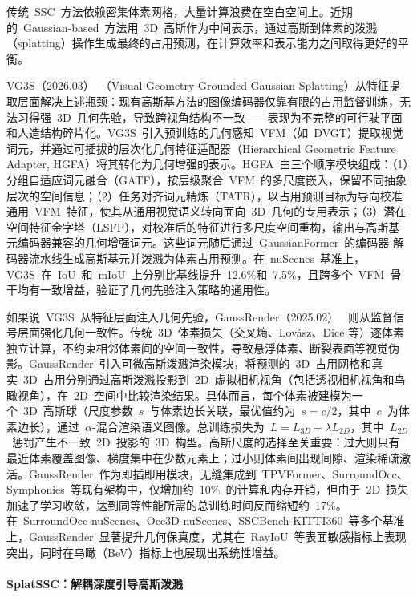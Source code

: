 传统~SSC~方法依赖密集体素网格，大量计算浪费在空白空间上。近期的~Gaussian-based~方法用~3D~高斯作为中间表示，通过高斯到体素的泼溅（splatting）操作生成最终的占用预测，在计算效率和表示能力之间取得更好的平衡。

VG3S（2026.03）~\cite{2603_06210}（Visual Geometry Grounded Gaussian Splatting）从特征提取层面解决上述瓶颈：现有高斯基方法的图像编码器仅靠有限的占用监督训练，无法习得强~3D~几何先验，导致跨视角结构不一致——表现为不完整的可行驶平面和人造结构碎片化。VG3S~引入预训练的几何感知~VFM（如~DVGT）提取视觉词元，并通过可插拔的层次化几何特征适配器（Hierarchical Geometric Feature Adapter, HGFA）将其转化为几何增强的表示。HGFA~由三个顺序模块组成：（1）分组自适应词元融合（GATF），按层级聚合~VFM~的多尺度嵌入，保留不同抽象层次的空间信息；（2）任务对齐词元精炼（TATR），以占用预测目标为导向校准通用~VFM~特征，使其从通用视觉语义转向面向~3D~几何的专用表示；（3）潜在空间特征金字塔（LSFP），对校准后的特征进行多尺度空间重构，输出与高斯基元编码器兼容的几何增强词元。这些词元随后通过~GaussianFormer~的编码器-解码器流水线生成高斯基元并泼溅为体素占用预测。在~nuScenes~基准上，VG3S~在~IoU~和~mIoU~上分别比基线提升~12.6\%和~7.5\%，且跨多个~VFM~骨干均有一致增益，验证了几何先验注入策略的通用性。

如果说~VG3S~从特征层面注入几何先验，GaussRender（2025.02）~\cite{2502_05040} 则从监督信号层面强化几何一致性。传统~3D~体素损失（交叉熵、Lovász、Dice 等）逐体素独立计算，不约束相邻体素间的空间一致性，导致悬浮体素、断裂表面等视觉伪影。GaussRender~引入可微高斯泼溅渲染模块，将预测的~3D~占用网格和真实~3D~占用分别通过高斯泼溅投影到~2D~虚拟相机视角（包括透视相机视角和鸟瞰视角），在~2D~空间中比较渲染结果。具体而言，每个体素被建模为一个~3D~高斯球（尺度参数~$s$~与体素边长关联，最优值约为~$s = c/2$，其中~$c$~为体素边长），通过~$\alpha$-混合渲染语义图像。总训练损失为~$L = L_{3D} + \lambda L_{2D}$，其中~$L_{2D}$~惩罚产生不一致~2D~投影的~3D~构型。高斯尺度的选择至关重要：过大则只有最近体素覆盖图像、梯度集中在少数元素上；过小则体素间出现间隙、渲染稀疏激活。GaussRender~作为即插即用模块，无缝集成到~TPVFormer、SurroundOcc、Symphonies~等现有架构中，仅增加约~10\%~的计算和内存开销，但由于~2D~损失加速了学习收敛，达到同等性能所需的总训练时间反而缩短约~17\%。在~SurroundOcc-nuScenes、Occ3D-nuScenes、SSCBench-KITTI360~等多个基准上，GaussRender~显著提升几何保真度，尤其在~RayIoU~等表面敏感指标上表现突出，同时在鸟瞰（BeV）指标上也展现出系统性增益。

\paragraph{SplatSSC：解耦深度引导高斯泼溅}

